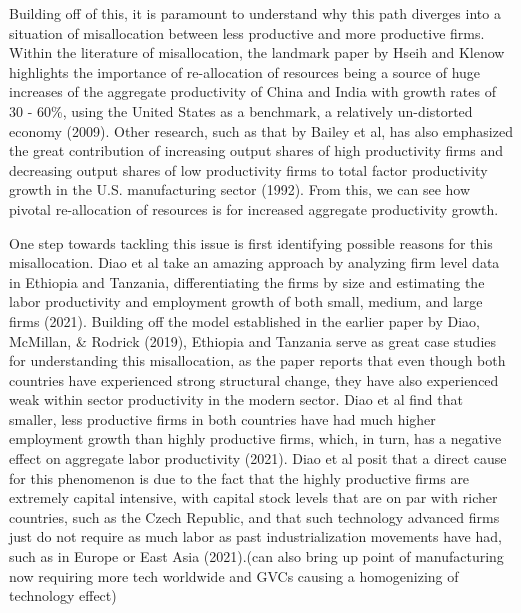 \documentclass[
  12pt,
  letterpaper,
  DIV=11,
  numbers=noendperiod]{scrartcl}
\begin{document}
Building off of this, it is paramount to understand why this path
diverges into a situation of misallocation between less productive and
more productive firms. Within the literature of misallocation, the
landmark paper by Hseih and Klenow highlights the importance of
re-allocation of resources being a source of huge increases of the
aggregate productivity of China and India with growth rates of 30 -
60\%, using the United States as a benchmark, a relatively un-distorted
economy (2009). Other research, such as that by Bailey et al, has also
emphasized the great contribution of increasing output shares of high
productivity firms and decreasing output shares of low productivity
firms to total factor productivity growth in the U.S. manufacturing
sector (1992). From this, we can see how pivotal re-allocation of
resources is for increased aggregate productivity growth.

One step towards tackling this issue is first identifying possible
reasons for this misallocation. Diao et al take an amazing approach by
analyzing firm level data in Ethiopia and Tanzania, differentiating the
firms by size and estimating the labor productivity and employment
growth of both small, medium, and large firms (2021). Building off the
model established in the earlier paper by Diao, McMillan, \& Rodrick
(2019), Ethiopia and Tanzania serve as great case studies for
understanding this misallocation, as the paper reports that even though
both countries have experienced strong structural change, they have also
experienced weak within sector productivity in the modern sector. Diao
et al find that smaller, less productive firms in both countries have
had much higher employment growth than highly productive firms, which,
in turn, has a negative effect on aggregate labor productivity (2021).
Diao et al posit that a direct cause for this phenomenon is due to the
fact that the highly productive firms are extremely capital intensive,
with capital stock levels that are on par with richer countries, such as
the Czech Republic, and that such technology advanced firms just do not
require as much labor as past industrialization movements have had, such
as in Europe or East Asia (2021).(can also bring up point of
manufacturing now requiring more tech worldwide and GVCs causing a
homogenizing of technology effect)
\end{document}
